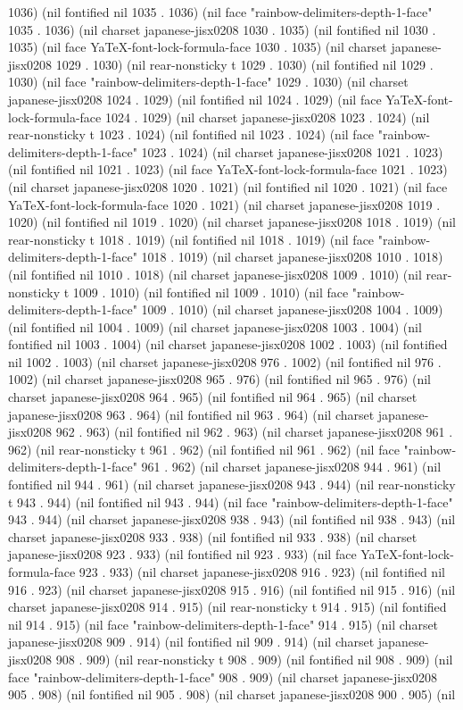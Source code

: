 1036) (nil fontified nil 1035 . 1036) (nil face "rainbow-delimiters-depth-1-face" 1035 . 1036) (nil charset japanese-jisx0208 1030 . 1035) (nil fontified nil 1030 . 1035) (nil face YaTeX-font-lock-formula-face 1030 . 1035) (nil charset japanese-jisx0208 1029 . 1030) (nil rear-nonsticky t 1029 . 1030) (nil fontified nil 1029 . 1030) (nil face "rainbow-delimiters-depth-1-face" 1029 . 1030) (nil charset japanese-jisx0208 1024 . 1029) (nil fontified nil 1024 . 1029) (nil face YaTeX-font-lock-formula-face 1024 . 1029) (nil charset japanese-jisx0208 1023 . 1024) (nil rear-nonsticky t 1023 . 1024) (nil fontified nil 1023 . 1024) (nil face "rainbow-delimiters-depth-1-face" 1023 . 1024) (nil charset japanese-jisx0208 1021 . 1023) (nil fontified nil 1021 . 1023) (nil face YaTeX-font-lock-formula-face 1021 . 1023) (nil charset japanese-jisx0208 1020 . 1021) (nil fontified nil 1020 . 1021) (nil face YaTeX-font-lock-formula-face 1020 . 1021) (nil charset japanese-jisx0208 1019 . 1020) (nil fontified nil 1019 . 1020) (nil charset japanese-jisx0208 1018 . 1019) (nil rear-nonsticky t 1018 . 1019) (nil fontified nil 1018 . 1019) (nil face "rainbow-delimiters-depth-1-face" 1018 . 1019) (nil charset japanese-jisx0208 1010 . 1018) (nil fontified nil 1010 . 1018) (nil charset japanese-jisx0208 1009 . 1010) (nil rear-nonsticky t 1009 . 1010) (nil fontified nil 1009 . 1010) (nil face "rainbow-delimiters-depth-1-face" 1009 . 1010) (nil charset japanese-jisx0208 1004 . 1009) (nil fontified nil 1004 . 1009) (nil charset japanese-jisx0208 1003 . 1004) (nil fontified nil 1003 . 1004) (nil charset japanese-jisx0208 1002 . 1003) (nil fontified nil 1002 . 1003) (nil charset japanese-jisx0208 976 . 1002) (nil fontified nil 976 . 1002) (nil charset japanese-jisx0208 965 . 976) (nil fontified nil 965 . 976) (nil charset japanese-jisx0208 964 . 965) (nil fontified nil 964 . 965) (nil charset japanese-jisx0208 963 . 964) (nil fontified nil 963 . 964) (nil charset japanese-jisx0208 962 . 963) (nil fontified nil 962 . 963) (nil charset japanese-jisx0208 961 . 962) (nil rear-nonsticky t 961 . 962) (nil fontified nil 961 . 962) (nil face "rainbow-delimiters-depth-1-face" 961 . 962) (nil charset japanese-jisx0208 944 . 961) (nil fontified nil 944 . 961) (nil charset japanese-jisx0208 943 . 944) (nil rear-nonsticky t 943 . 944) (nil fontified nil 943 . 944) (nil face "rainbow-delimiters-depth-1-face" 943 . 944) (nil charset japanese-jisx0208 938 . 943) (nil fontified nil 938 . 943) (nil charset japanese-jisx0208 933 . 938) (nil fontified nil 933 . 938) (nil charset japanese-jisx0208 923 . 933) (nil fontified nil 923 . 933) (nil face YaTeX-font-lock-formula-face 923 . 933) (nil charset japanese-jisx0208 916 . 923) (nil fontified nil 916 . 923) (nil charset japanese-jisx0208 915 . 916) (nil fontified nil 915 . 916) (nil charset japanese-jisx0208 914 . 915) (nil rear-nonsticky t 914 . 915) (nil fontified nil 914 . 915) (nil face "rainbow-delimiters-depth-1-face" 914 . 915) (nil charset japanese-jisx0208 909 . 914) (nil fontified nil 909 . 914) (nil charset japanese-jisx0208 908 . 909) (nil rear-nonsticky t 908 . 909) (nil fontified nil 908 . 909) (nil face "rainbow-delimiters-depth-1-face" 908 . 909) (nil charset japanese-jisx0208 905 . 908) (nil fontified nil 905 . 908) (nil charset japanese-jisx0208 900 . 905) (nil 
